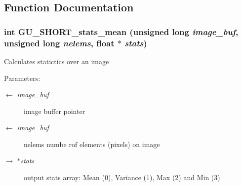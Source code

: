 \subsection{Function Documentation}
\subsubsection{\setlength{\rightskip}{0pt plus 5cm}int GU\_\-SHORT\_\-stats\_\-mean (unsigned long {\em image\_\-buf}, unsigned long {\em nelems}, float $\ast$ {\em stats})}\label{GU__stats_8c_735e375abc65e233d70417fc55afcc75}


Calculates statictics over an image \begin{Desc}
\item[Parameters:]
\begin{description}
\item[\mbox{$\leftarrow$} {\em image\_\-buf}]image buffer pointer \item[\mbox{$\leftarrow$} {\em image\_\-buf}]nelems numbe rof elements (pixels) on image \item[\mbox{$\rightarrow$} {\em $\ast$stats}]output stats array: Mean (0), Variance (1), Max (2) and Min (3) \end{description}
\end{Desc}
